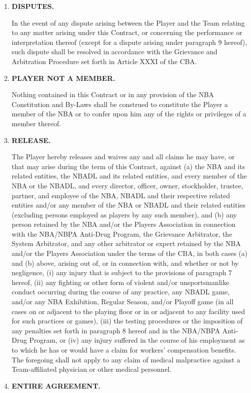 \documentclass[
]{book}
\begin{document}
\begin{enumerate}
\def\labelenumi{\arabic{enumi}.}
\setcounter{enumi}{16}
\item
  \textbf{DISPUTES.}

  In the event of any dispute arising between the Player and the Team relating to any matter arising under this Contract, or concerning the performance or interpretation thereof (except for a dispute arising under paragraph 9 hereof), such dispute shall be resolved in accordance with the Grievance and Arbitration Procedure set forth in Article XXXI of the CBA.
\item
  \textbf{PLAYER NOT A MEMBER.}

  Nothing contained in this Contract or in any provision of the NBA Constitution and By-Laws shall be construed to constitute the Player a member of the NBA or to confer upon him any of the rights or privileges of a member thereof.
\item
  \textbf{RELEASE.}

  The Player hereby releases and waives any and all claims he may have, or that may arise during the term of this Contract, against (a) the NBA and its related entities, the NBADL and its related entities, and every member of the NBA or the NBADL, and every director, officer, owner, stockholder, trustee, partner, and employee of the NBA, NBADL and their respective related entities and/or any member of the NBA or NBADL and their related entities (excluding persons employed as players by any such member), and (b) any person retained by the NBA and/or the Players Association in connection with the NBA/NBPA Anti-Drug Program, the Grievance Arbitrator, the System Arbitrator, and any other arbitrator or expert retained by the NBA and/or the Players Association under the terms of the CBA, in both cases (a) and (b) above, arising out of, or in connection with, and whether or not by negligence, (i) any injury that is subject to the provisions of paragraph 7 hereof, (ii) any fighting or other form of violent and/or unsportsmanlike conduct occurring during the course of any practice, any NBADL game, and/or any NBA Exhibition, Regular Season, and/or Playoff game (in all cases on or adjacent to the playing floor or in or adjacent to any facility used for such practices or games), (iii) the testing procedures or the imposition of any penalties set forth in paragraph 8 hereof and in the NBA/NBPA Anti-Drug Program, or (iv) any injury suffered in the course of his employment as to which he has or would have a claim for workers' compensation benefits. The foregoing shall not apply to any claim of medical malpractice against a Team-affiliated physician or other medical personnel.
\item
  \textbf{ENTIRE AGREEMENT.}


\end{enumerate}
\end{document}
